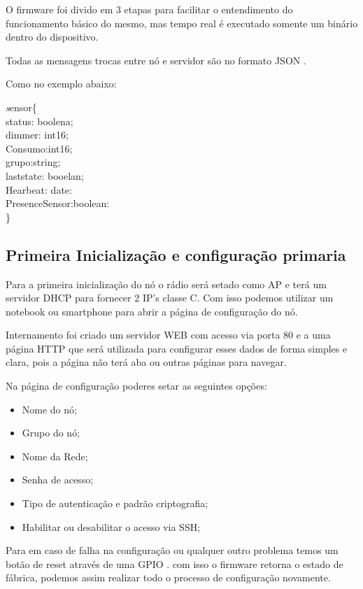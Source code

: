 \documentclass[openright]{normas-utf-tex} %
\begin{document}
O firmware foi divido em 3 etapas para facilitar o entendimento do funcionamento básico do mesmo, mas tempo real é executado somente um binário dentro do dispositivo.

Todas as mensagens trocas entre nó e servidor são no formato JSON  \cite{json-devmedia}.

Como no exemplo abaixo:
\begin{center}
\textit
sensor\{\\ 
status: boolena; \\
dimmer: int16;\\
Consumo:int16; \\
grupo:string;\\
laststate: booelan;\\
Hearbeat: date: \\
PresenceSensor:boolean:\\
\}
\end{center}


\subsection{Primeira Inicialização e configuração primaria}
Para a primeira inicialização do nó o rádio será setado como AP e terá um servidor DHCP para fornecer 2 IP's classe C.
Com isso podemos utilizar um notebook ou smartphone para abrir a página de configuração do nó.

Internamento foi criado um servidor WEB com acesso via porta 80 e a uma página HTTP que será utilizada para configurar esses dados de forma simples e clara, pois a página não terá aba ou outras páginas para navegar.

Na página de configuração poderes setar as seguintes opções:
\begin{itemize}
    \item Nome do nó;
    \item Grupo do nó;
    \item Nome da Rede;
    \item Senha de acesso;
    \item Tipo de autenticação e padrão criptografia;
    \item Habilitar ou desabilitar o acesso via SSH;
\end{itemize}

Para em caso de falha na configuração ou qualquer outro problema temos um botão de reset através de uma GPIO  \cite{Elsevier}. com isso o firmware retorna o estado de fábrica, podemos assim realizar todo o processo de configuração novamente.
\end{document}
